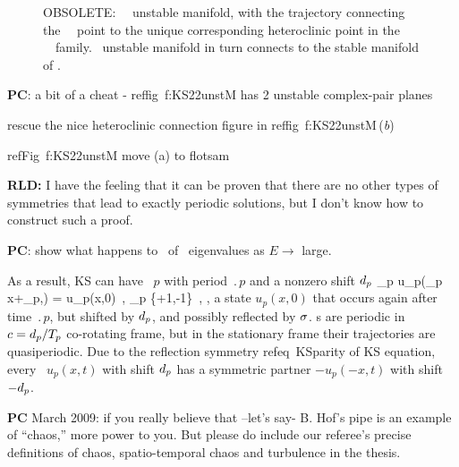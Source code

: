 \begin{figure} [t]
\begin{center}
\end{center}
\caption[OBSOLETE: EQV{1}~\eqv\ unstable manifold]
        {OBSOLETE:
~\eqv\ unstable manifold,
    with the trajectory connecting the
~\eqv\ point to the unique corresponding heteroclinic
point in the ~\eqv\ family.
~unstable manifold in turn connects  to the
stable manifold of .
        }
\label{f:KS22cage}
\end{figure}
{\bf PC}: a bit of a cheat - reffig~{f:KS22unstM} has
    2 unstable complex-pair planes

rescue the nice heteroclinic connection figure
    in reffig~{f:KS22unstM}\,(\textit{b})

    refFig~{f:KS22unstM} move (a) to flotsam

{\bf RLD:} I have the feeling that it can be proven that there are
no other types of symmetries that lead to exactly periodic
solutions, but I don't know how to construct such a proof.

{\bf PC}: show what happens to \eqva\ of \eqva\ eigenvalues
as $E \to $ large.

\bigskip

As a result, KS can have
\rpo\ $p$ with period $\period{p}$ and
a nonzero shift $d_p$
\beq
\sigma_p u_p(\sigma_p x+\shift_p,) = u_p(x,0)
\,,\qquad
\sigma_p \in \{+1,-1\}
\,,
\ie, a state $u_p(x,0)$ that occurs again after time $\period{p}$,
but shifted by $d_p$, and possibly reflected by $\sigma$.
{\Rpo s} are periodic in $c=d_p/{T_{p}}$
co-rotating frame,
but in the stationary frame their trajectories
are quasiperiodic.
Due to the reflection symmetry refeq~{KSparity} of KS equation,
every \rpo\
$u_p(x,t)$ with shift $d_p$ has a symmetric partner
$-u_p(-x,t)$ with shift $-d_p$.

{\bf PC} March 2009:
if you really believe that --let's say- B. Hof's pipe is an example of ``chaos,'' more
    power to you. But please do include our referee's precise definitions of
    chaos, spatio-temporal chaos and turbulence in the thesis.

